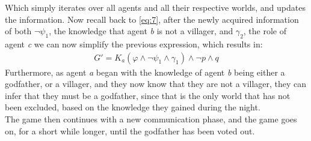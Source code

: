 Which simply iterates over all agents and all their respective worlds, and
updates the information. Now recall back to \cref{eq:7}, after the newly
acquired information of both $\neg \psi_1$, the knowledge that agent \textit{b}
is not a villager, and $\gamma_2$, the role of agent \textit{c} we can now
simplify the previous expression, which results in:
\begin{align}
	G' = K_a(\varphi \land \neg \psi_1 \land \gamma_1) \land \neg p \land q
\end{align}
Furthermore, as agent \textit{a} began with the knowledge of agent \textit{b}
being either a godfather, or a villager, and they now know that they are not a
villager, they can infer that they must be a godfather, since that is the only
world that has not been excluded, based on the knowledge they gained during the
night. \\
The game then continues with a new communication phase, and the game goes on,
for a short while longer, until the godfather has been voted out.
